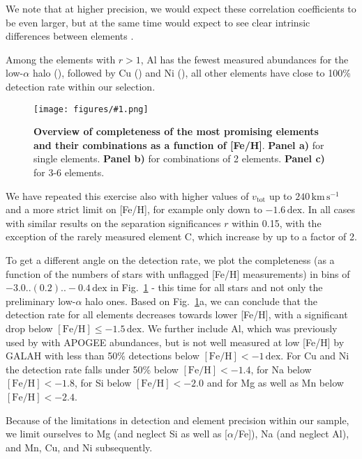 \documentclass[fleqn,usenatbib]{mnras}
\newcommand{\dex}{\,\mathrm{dex}}	%
\newcommand{\kms}{\,\mathrm{km\,s^{-1}}}	%
\newcommand{\codeicon}{{\faCloudDownload}}
\newcommand{\codelink}[1]{\href{https://github.com/svenbuder/Accreted-stars-in-GALAH-DR3/tree/main/figures/#1.ipynb}{\codeicon}\,\,}
\newcommand{\oscaption}[2]{\caption{#2 \codelink{#1}}}
\newcommand{\figurecolumnwidth}[3]{\begin{figure} \centering \texttt{[image: figures/\#1.png]}\oscaption{#2}{#3}\label{fig:#1} \end{figure}}
\begin{document}
We note that at higher precision, we would expect these correlation coefficients to be even larger, but at the same time would expect to see clear intrinsic differences between elements \citep[e.g.][]{Ting2021, Weinberg2021}.

Among the elements with $r > 1$, Al has the fewest measured abundances for the low-$\alpha$ halo (), followed by Cu () and Ni (), all other elements have close to 100\% detection rate within our selection. 

\figurecolumnwidth{Completeness_Combinations}{gaussian_mixture_models}{
\textbf{Overview of completeness of the most promising elements and their combinations as a function of [Fe/H]}.
\textbf{Panel a)} for single elements.
\textbf{Panel b)} for combinations of 2 elements.
\textbf{Panel c)} for 3-6 elements.
}

We have repeated this exercise also with higher values of $v_\text{tot}$ up to $240\kms$ and a more strict limit on [Fe/H], for example only down to $-1.6\dex$. In all cases with similar results on the separation significances $r$ within 0.15, with the exception of the rarely measured element C, which increase by up to a factor of 2.

To get a different angle on the detection rate, we plot the completeness (as a function of the numbers of stars with unflagged [Fe/H] measurements) in bins of $-3.0..(0.2)..-0.4\,\mathrm{dex}$ in Fig.~\ref{fig:Completeness_Combinations} - this time for all stars and not only the preliminary low-$\alpha$ halo ones. Based on Fig.~\ref{fig:Completeness_Combinations}a, we can conclude that the detection rate for all elements decreases towards lower [Fe/H], with a significant drop below $\mathrm{[Fe/H]} \leq -1.5\dex$. We further include Al, which was previously used by \citet{Das2020} with APOGEE abundances, but is not well measured at low [Fe/H] by GALAH with less than 50\% detections below $\mathrm{[Fe/H]} < -1\dex$. For Cu and Ni the detection rate falls under 50\% below $\mathrm{[Fe/H]} < -1.4$, for Na below $\mathrm{[Fe/H]} < -1.8$, for Si below $\mathrm{[Fe/H]} < -2.0$ and for Mg as well as Mn below $\mathrm{[Fe/H]} < -2.4$.


Because of the limitations in detection and element precision within our sample, we limit ourselves to Mg (and neglect Si as well as [$\alpha$/Fe]), Na (and neglect Al), and Mn, Cu, and Ni subsequently.
\end{document}
